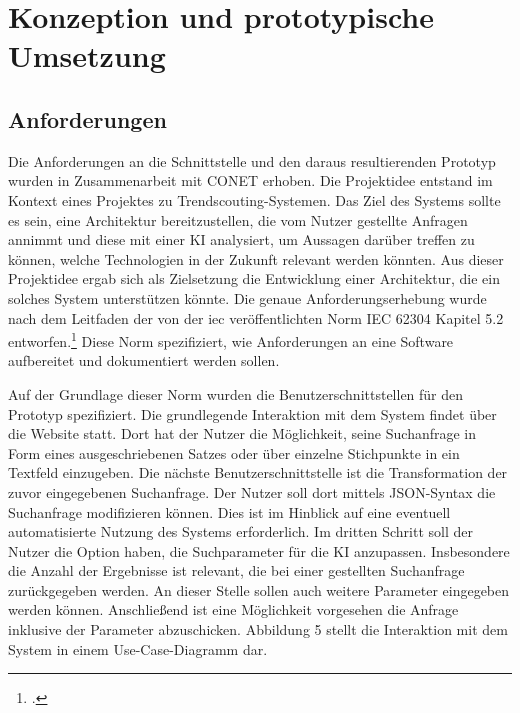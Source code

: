 \section{Konzeption und prototypische Umsetzung}
\subsection{Anforderungen}
Die Anforderungen an die Schnittstelle und den daraus resultierenden Prototyp wurden in Zusammenarbeit mit CONET erhoben. Die Projektidee entstand im Kontext eines Projektes zu Trendscouting-Systemen. Das Ziel des Systems sollte es sein, eine Architektur bereitzustellen, die vom Nutzer gestellte Anfragen annimmt und diese mit einer KI analysiert, um Aussagen darüber treffen zu können, welche Technologien in der Zukunft relevant werden könnten. Aus dieser Projektidee ergab sich als Zielsetzung die Entwicklung einer Architektur, die ein solches System unterstützen könnte. Die genaue Anforderungserhebung wurde nach dem Leitfaden der von der \ac{iec} veröffentlichten Norm IEC 62304 Kapitel 5.2 entworfen.\footcite{daniel2018anforderungen} Diese Norm spezifiziert, wie Anforderungen an eine Software aufbereitet und dokumentiert werden sollen.

Auf der Grundlage dieser Norm wurden die Benutzerschnittstellen für den Prototyp spezifiziert. Die grundlegende Interaktion mit dem System findet über die Website statt. Dort hat der Nutzer die Möglichkeit, seine Suchanfrage in Form eines ausgeschriebenen Satzes oder über einzelne Stichpunkte in ein Textfeld einzugeben. Die nächste Benutzerschnittstelle ist die Transformation der zuvor eingegebenen Suchanfrage. Der Nutzer soll dort mittels JSON-Syntax die Suchanfrage modifizieren können. Dies ist im Hinblick auf eine eventuell automatisierte Nutzung des Systems erforderlich. Im dritten Schritt soll der Nutzer die Option haben, die Suchparameter für die KI anzupassen. Insbesondere   die Anzahl der Ergebnisse ist relevant, die bei einer gestellten Suchanfrage zurückgegeben werden. An dieser Stelle sollen auch weitere Parameter eingegeben werden können. Anschließend ist eine Möglichkeit vorgesehen die Anfrage inklusive der Parameter abzuschicken. Abbildung 5 stellt die Interaktion mit dem System in einem Use-Case-Diagramm dar.

